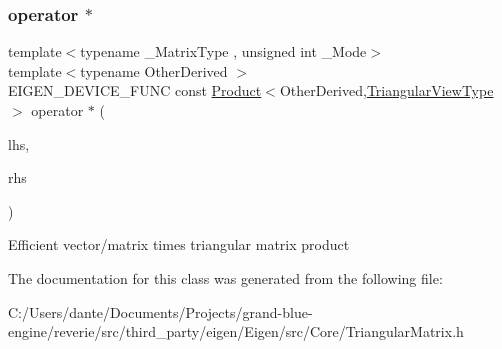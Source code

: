 \subsubsection{\texorpdfstring{operator $\ast$}{operator *}}
{\footnotesize\ttfamily template$<$typename \+\_\+\+Matrix\+Type , unsigned int \+\_\+\+Mode$>$ \\
template$<$typename Other\+Derived $>$ \\
E\+I\+G\+E\+N\+\_\+\+D\+E\+V\+I\+C\+E\+\_\+\+F\+U\+NC const \mbox{\hyperlink{class_eigen_1_1_product}{Product}}$<$Other\+Derived,\mbox{\hyperlink{class_eigen_1_1_triangular_view}{Triangular\+View\+Type}}$>$ operator $\ast$ (\begin{DoxyParamCaption}\item[{const \mbox{\hyperlink{class_eigen_1_1_matrix_base}{Matrix\+Base}}$<$ Other\+Derived $>$ \&}]{lhs,  }\item[{const \mbox{\hyperlink{class_eigen_1_1_triangular_view_impl}{Triangular\+View\+Impl}}$<$ \+\_\+\+Matrix\+Type, \+\_\+\+Mode, \mbox{\hyperlink{struct_eigen_1_1_dense}{Dense}} $>$ \&}]{rhs }\end{DoxyParamCaption})\hspace{0.3cm}{\ttfamily [friend]}}

Efficient vector/matrix times triangular matrix product 

The documentation for this class was generated from the following file\+:\begin{DoxyCompactItemize}
\item 
C\+:/\+Users/dante/\+Documents/\+Projects/grand-\/blue-\/engine/reverie/src/third\+\_\+party/eigen/\+Eigen/src/\+Core/Triangular\+Matrix.\+h\end{DoxyCompactItemize}
